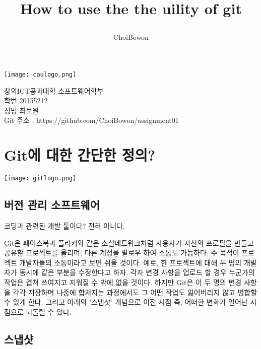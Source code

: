 \documentclass[11pt]{article}
\begin{document}
\title{\begin{Huge}{How to use the the uility of git}\end{Huge}} 
\author{ChoiBowon}
\maketitle
\begin{center}\vspace{10mm}\texttt{[image: caulogo.png]}\end{center}

\begin{flushleft}
\vspace{25mm}
창의ICT공과대학 소프트웨어학부 \\학번 20155212 \\성명 최보원 \\Git 주소 : https://github.com/ChoiBowon/assignment01
\end{flushleft}

\newpage
\tableofcontents

\newpage
\section{Git에 대한 간단한 정의?}
\begin{center}\texttt{[image: gitlogo.png]}\end{center}
	\subsection{버전 관리 소프트웨어}
	
	코딩과 관련된 개발 툴이다? 전혀 아니다. 
	
	Git은 페이스북과 플리커와 같은 소셜네트워크처럼 사용자가 자신의 프로필을 만들고 공유할 프로젝트를 올리며, 다른 계정을 팔로우 하여 소통도 가능하다. 주 목적이 프로젝트 개발자들의 소통이라고 보면 쉬울 것이다. 예로, 한 프로젝트에 대해 두 명의 개발자가 동시에 같은 부분을 수정한다고 하자. 각자 변경 사항을 업로드 할 경우 누군가의 작업은 겹쳐 쓰여지고 지워질 수 밖에 없을 것이다. 하지만 Git은 이 두 명의 변경 사항을 각각 저장하며 나중에 합쳐지는 과정에서도 그 어떤 작업도 잃어버리지 않고 병합할 수 있게 한다. 그리고 아래의 '스냅샷' 개념으로 이전 시점 즉, 어떠한 변화가 일어난 시점으로 되돌릴 수 있다.

	\subsection{스냅샷}
\end{document}
